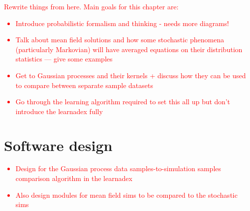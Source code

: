 \textcolor{red}{
Rewrite things from here. Main goals for this chapter are:
\begin{itemize}
\item{Introduce probabilistic formalism and thinking - needs more diagrams!}
\item{Talk about mean field solutions and how some stochastic phenomena (particularly Markovian) will have averaged equations on their distribution statistics --- give some examples}
\item{Get to Gaussian processes and their kernels + discuss how they can be used to compare between separate sample datasets}
\item{Go through the learning algorithm required to set this all up but don't introduce the learnadex fully}
\end{itemize}
}

\section{\sffamily Software design}

\textcolor{red}{
\begin{itemize}
\item{Design for the Gaussian process data samples-to-simulation samples comparison algorithm in the learnadex}
\item{Also design modules for mean field sims to be compared to the stochastic sims}
\end{itemize}
}

    